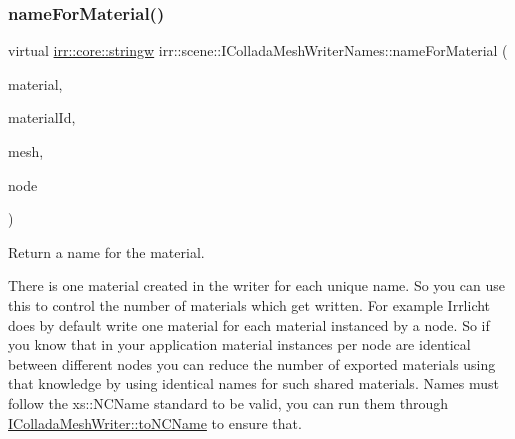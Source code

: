\subsubsection{\texorpdfstring{name\+For\+Material()}{nameForMaterial()}\hspace{0.1cm}{\footnotesize\ttfamily [2/2]}}
{\footnotesize\ttfamily virtual \hyperlink{namespaceirr_1_1core_a5aedb62cb47cf01d1c548ab5e6344d2d}{irr\+::core\+::stringw} irr\+::scene\+::\+I\+Collada\+Mesh\+Writer\+Names\+::name\+For\+Material (\begin{DoxyParamCaption}\item[{const \hyperlink{classirr_1_1video_1_1SMaterial}{video\+::\+S\+Material} \&}]{material,  }\item[{int}]{material\+Id,  }\item[{const \hyperlink{classirr_1_1scene_1_1IMesh}{scene\+::\+I\+Mesh} $\ast$}]{mesh,  }\item[{const \hyperlink{classirr_1_1scene_1_1ISceneNode}{scene\+::\+I\+Scene\+Node} $\ast$}]{node }\end{DoxyParamCaption})\hspace{0.3cm}{\ttfamily [pure virtual]}}



Return a name for the material. 

There is one material created in the writer for each unique name. So you can use this to control the number of materials which get written. For example Irrlicht does by default write one material for each material instanced by a node. So if you know that in your application material instances per node are identical between different nodes you can reduce the number of exported materials using that knowledge by using identical names for such shared materials. Names must follow the xs\+::\+N\+C\+Name standard to be valid, you can run them through \hyperlink{classirr_1_1scene_1_1IColladaMeshWriter_ac9c48beab095aa6f4cb4f696bb2ecd45}{I\+Collada\+Mesh\+Writer\+::to\+N\+C\+Name} to ensure that. \mbox{\label{classirr_1_1scene_1_1IColladaMeshWriterNames_a2d36f1dee5904b3c622363282761ed0d}} 
